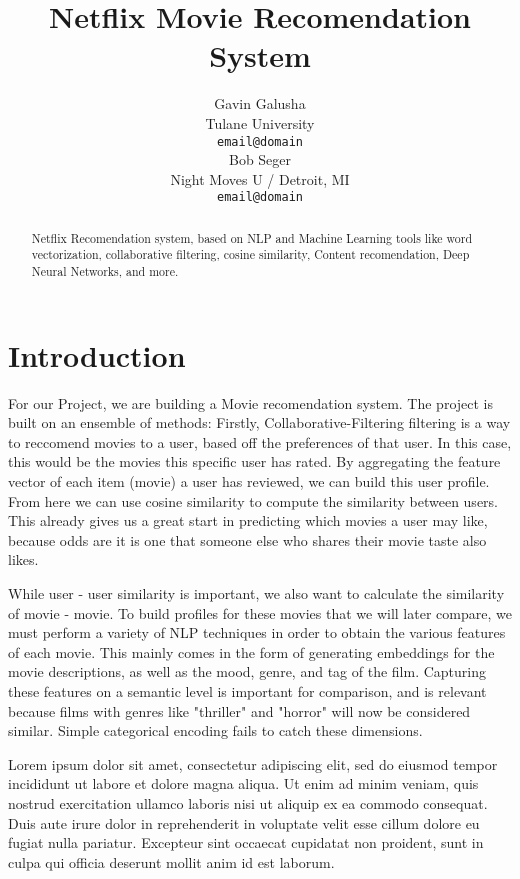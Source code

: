 \documentclass[11pt,a4paper]{article}
\title{Netflix Movie Recomendation System}
\author{Gavin Galusha \\
  Tulane University \\
  \texttt{email@domain} \\\And
  Bob Seger \\
  Night Moves U / Detroit, MI \\
  \texttt{email@domain} \\}
\date{}
\begin{document}
\maketitle
\begin{abstract}
Netflix Recomendation system, based on NLP and Machine Learning tools like word vectorization, collaborative filtering, cosine similarity, Content recomendation, Deep Neural Networks, and more.
\end{abstract}


\section{Introduction}

For our Project, we are building a Movie recomendation system. The project is built on an ensemble of methods: Firstly, Collaborative-Filtering filtering is a way to reccomend movies to a user, based off the preferences of that user. In this case, this would be the movies this specific user has rated.
By aggregating the feature vector of each item (movie) a user has reviewed, we can build this user profile. From here we can use cosine similarity to compute the similarity between users. This already gives us a great start in predicting which movies a user may like, because odds are it is one that someone else
who shares their movie taste also likes.

While user - user similarity is important, we also want to calculate the similarity of movie - movie. To build profiles for these movies that we will later compare, we must perform a variety of NLP techniques in order to obtain the various features of each movie. This mainly
comes in the form of generating embeddings for the movie descriptions, as well as the mood, genre, and tag of the film. Capturing these features on a semantic level is important for comparison, and is relevant because films with genres like "thriller" and "horror" will now be considered similar. Simple categorical encoding fails to catch these dimensions.




Lorem ipsum dolor sit amet, consectetur adipiscing elit, sed do eiusmod tempor incididunt ut labore et dolore magna aliqua. Ut enim ad minim veniam, quis nostrud exercitation ullamco laboris nisi ut aliquip ex ea commodo consequat. Duis aute irure dolor in reprehenderit in voluptate velit esse cillum dolore eu fugiat nulla pariatur. Excepteur sint occaecat cupidatat non proident, sunt in culpa qui officia deserunt mollit anim id est laborum.
\end{document}
